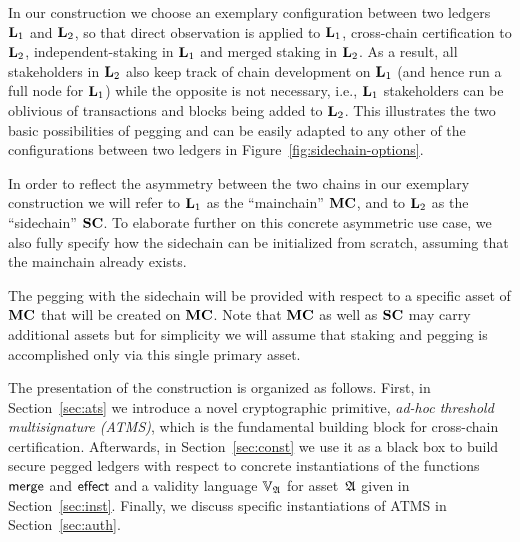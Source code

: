 In our construction we choose an exemplary
configuration between two ledgers $\Ledger_1$ and
$\Ledger_2$, so that direct observation is applied to $\Ledger_1$,
cross-chain certification to $\Ledger_2$, independent-staking in $\Ledger_1$ and
merged staking in $\Ledger_2$.
As a result, all stakeholders in $\Ledger_2$ also keep track
of chain development on $\Ledger_1$ (and hence run a full node for $\Ledger_1$)
while the opposite is not necessary, i.e.,
$\Ledger_1$ stakeholders can be oblivious of transactions and
blocks being added to $\Ledger_2$.
This illustrates the two basic possibilities
of pegging and can be easily adapted
to  any other of the configurations between two ledgers in Figure~\ref{fig:sidechain-options}.

In order to reflect the asymmetry between the two chains in our exemplary
construction we will refer to $\Ledger_1$ as the ``mainchain'' $\Mainchain$, and to
$\Ledger_2$ as the ``sidechain'' $\Sidechain$. To elaborate further on this concrete
asymmetric use case, we also fully specify how the sidechain can be
initialized from scratch, assuming that the mainchain already exists.



The pegging with the sidechain will be provided with respect to a specific asset of $\Mainchain$
that will be created on $\Mainchain$.
Note that $\Mainchain$ as well as $\Sidechain$ may carry
additional assets but for simplicity we will assume that staking and pegging is
accomplished only via this single primary asset.

The presentation of the construction is organized as follows. First, in Section~\ref{sec:ats} we introduce a novel
cryptographic primitive, \emph{ad-hoc threshold multisignature (ATMS)}, which is the fundamental building block for cross-chain certification.
Afterwards, in Section~\ref{sec:const} we use it as a black box to build secure
pegged ledgers with respect to concrete instantiations of the functions $\merge$
and $\effect$ and a validity language $\adalang$ for asset~$\ada$ given in Section~\ref{sec:inst}.
Finally, we discuss specific instantiations of ATMS in
Section~\ref{sec:auth}.
